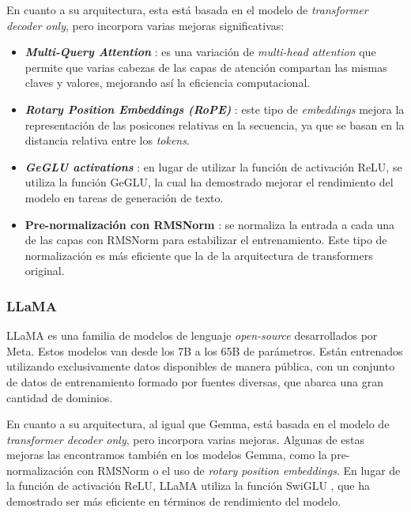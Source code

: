 \documentclass[11pt,spanish,listoffigures,listoftables]{tfgetsinf}
\begin{document}
En cuanto a su arquitectura, esta está basada en el modelo de \textit{transformer decoder only}, pero incorpora varias mejoras significativas:

\begin{itemize}
	\item \textbf{\textit{Multi-Query Attention}} \cite{shazeer2019fasttransformerdecodingwritehead}: es una variación de \textit{multi-head attention} que permite que varias cabezas de las capas de atención compartan las mismas claves y valores, mejorando así la eficiencia computacional.
	\item \textbf{\textit{Rotary Position Embeddings (RoPE)}} \cite{su2023roformerenhancedtransformerrotary}: este tipo de \textit{embeddings} mejora la representación de las posicones relativas en la secuencia, ya que se basan en la distancia relativa entre los \textit{tokens}.
	\item \textbf{\textit{GeGLU activations}} \cite{shazeer2020gluvariantsimprovetransformer}: en lugar de utilizar la función de activación ReLU, se utiliza la función GeGLU, la cual ha demostrado mejorar el rendimiento del modelo en tareas de generación de texto.
	\item \textbf{Pre-normalización con RMSNorm} \cite{zhang2019rootmeansquarelayer}: se normaliza la entrada a cada una de las capas con RMSNorm para estabilizar el entrenamiento. Este tipo de normalización es más eficiente que la de la arquitectura de transformers original.
\end{itemize}

\subsubsection{LLaMA}

LLaMA \cite{touvron2023llamaopenefficientfoundation} es una familia de modelos de lenguaje \textit{open-source} desarrollados por Meta. Estos modelos van desde los 7B a los 65B de parámetros. Están entrenados utilizando exclusivamente datos disponibles de manera pública, con un conjunto de datos de entrenamiento formado por fuentes diversas, que abarca una gran cantidad de dominios.

En cuanto a su arquitectura, al igual que Gemma, está basada en el modelo de \textit{transformer decoder only}, pero incorpora varias mejoras. Algunas de estas mejoras las encontramos también en los modelos Gemma, como la pre-normalización con RMSNorm o el uso de \textit{rotary position embeddings}. En lugar de la función de activación ReLU, LLaMA utiliza la función SwiGLU \cite{shazeer2020gluvariantsimprovetransformer}, que ha demostrado ser más eficiente en términos de rendimiento del modelo.
\end{document}
